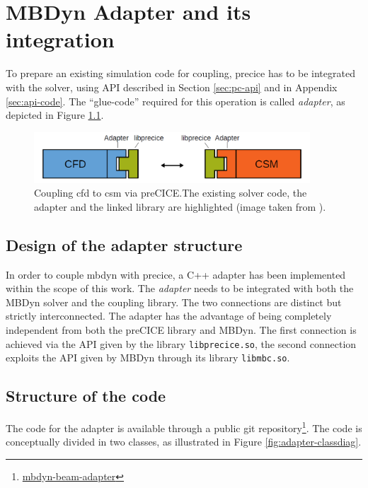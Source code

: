 \chapter{MBDyn Adapter and its integration}
\label{cha:adapter}


To prepare an existing simulation code for coupling, \acrshort{precice} has to be integrated with the solver, using  API described in Section \ref{sec:pc-api} and in Appendix \ref{sec:api-code}. The ``glue-code'' required for this operation is called \textit{adapter}, as depicted in Figure \ref{fig:adapter-scheme}.


\begin{figure}[htbp!]
	\centering
	\includegraphics[width=0.92\textwidth]{images/adapter_scheme}
	\caption{Coupling \acrshort{cfd} to \acrshort{csm} via preCICE.The existing solver code, the adapter and the linked library are highlighted (image taken from \cite{uekermann2017official}).}
	\label{fig:adapter-scheme}
\end{figure}


\section{Design of the adapter structure}


In order to couple \acrshort{mbdyn} with \acrshort{precice}, a C++ adapter has been implemented within the scope of this work. The \textit{adapter} needs to be integrated with both the MBDyn solver and the coupling library. The two connections are distinct but strictly interconnected.
The adapter has the advantage of being completely independent from both the preCICE library and MBDyn. The first connection is achieved via the API given by the library \texttt{libprecice.so}, the second connection exploits the API given by MBDyn through its library \texttt{libmbc.so}.


\section{Structure of the code}

The code for the adapter is available through a public git repository\footnote{\href{https://gitlab.com/Ccaccia73/mbdyn-adapter-test/-/tree/develop}{mbdyn-beam-adapter}}. The code is conceptually divided in two classes, as illustrated in Figure \ref{fig:adapter-classdiag}.

